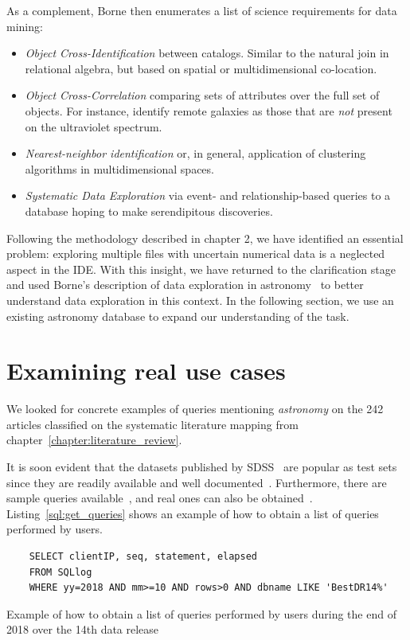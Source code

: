 As a complement, Borne then enumerates a list of science requirements for data mining:

\begin{itemize}
    \item \emph{Object Cross-Identification} between catalogs. Similar to the natural join
        in relational algebra, but based on spatial or multidimensional co-location.
    \item \emph{Object Cross-Correlation} comparing sets of attributes over the full set of objects.
        For instance, identify remote galaxies as those that are \emph{not} present on
        the ultraviolet spectrum.
    \item \emph{Nearest-neighbor identification} or, in general, application of clustering
        algorithms in multidimensional spaces.
    \item \emph{Systematic Data Exploration} via event- and relationship-based queries to a database
        hoping to make serendipitous discoveries.
\end{itemize}

Following the methodology described in chapter 2, we have identified an essential problem:
exploring multiple files with uncertain numerical data is a neglected aspect in the \gls{IDE}.
With this insight, we have returned to the clarification stage and used Borne's description
of data exploration in astronomy~\cite{Borne2001} to better understand data exploration in
this context. In the following section, we use an existing astronomy database to expand our
understanding of the task.

\section{Examining real use cases}

We looked for concrete examples of queries mentioning \emph{astronomy} on the
242 articles classified on the systematic literature mapping from
chapter~\ref{chapter:literature_review}.

It is soon evident that the datasets published by \gls{SDSS}~\cite{SDSS14} are popular as test
sets since they are readily available and well documented~\cite{Gray2002}.
Furthermore, there are sample queries available~\cite{SDSSSamples}, and real ones can also be
obtained~\cite{SDSSSqlLogs}. Listing~\ref{sql:get_queries} shows an example of how to obtain a list
of queries performed by users.

\begin{listing}[htbp]
\begin{verbatim}
    SELECT clientIP, seq, statement, elapsed
    FROM SQLlog
    WHERE yy=2018 AND mm>=10 AND rows>0 AND dbname LIKE 'BestDR14%'
\end{verbatim}
\caption[Obtaining a list of queries performed by  users]{
    Example of how to obtain a list of queries performed by users during the end of 2018 over the 14th data release
}\label{sql:get_queries}
\end{listing}

